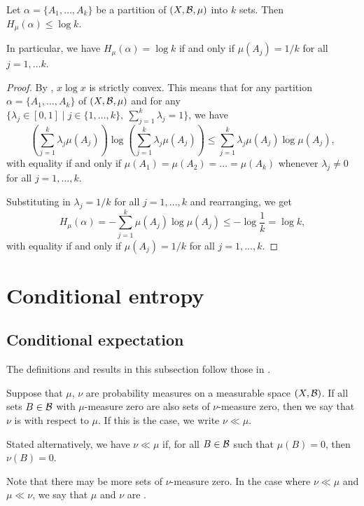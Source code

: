 \begin{proposition} \label{prop:walters-cor-4-2-1}
	Let $\alpha = \{A_1, \dots, A_k\}$ be a partition of $(X, \mathcal{B}, \mu)$ into $k$ sets. Then $H_\mu(\alpha) \leq \log{k}$.
	
	In particular, we have $H_\mu(\alpha) = \log{k}$ if and only if $\mu(A_j) = 1 / k$ for all $j = 1, \dots k$.
	
	\begin{proof}
		By , $x \log{x}$ is strictly convex. This means that for any partition $\alpha = \{A_1, \dots, A_k\}$ of $(X, \mathcal{B}, \mu)$ and for any $\{\lambda_j \in [0, 1] \mid j \in \{1, \dots, k\},\ \sum_{j = 1}^k{\lambda_j} = 1\}$, we have
		\[
			\left(\sum_{j = 1}^k{\lambda_j \mu(A_j)}\right) \log{\left(\sum_{j = 1}^k{\lambda_j \mu(A_j)}\right)} \leq \sum_{j = 1}^k{\lambda_j \mu(A_j) \log{\mu(A_j)}},
		\]
		with equality if and only if $\mu(A_1) = \mu(A_2) = \dots = \mu(A_k)$ whenever $\lambda_j \neq 0$ for all $j = 1, \dots, k$.
		
		Substituting in $\lambda_j = 1 / k$ for all $j = 1, \dots, k$ and rearranging, we get
		\[
			H_\mu(\alpha) = -\sum_{j = 1}^k{\mu(A_j) \log{\mu(A_j)}} \leq -\log{\frac{1}{k}} = \log{k},
		\]
		with equality if and only if $\mu(A_j) = 1 / k$ for all $j = 1, \dots, k$.
	\end{proof}
\end{proposition}

\section{Conditional entropy}
\subsection{Conditional expectation}
The definitions and results in this subsection follow those in \cite[p8-9]{walters:intro-to-ergodic-theory}.
\begin{definition}
	Suppose that $\mu$, $\nu$ are probability measures on a measurable space $(X, \mathcal{B})$. If all sets $B \in \mathcal{B}$ with $\mu$-measure zero are also sets of $\nu$-measure zero, then we say that $\nu$ is  with respect to $\mu$. If this is the case, we write $\nu \ll \mu$.
	
	Stated alternatively, we have $\nu \ll \mu$ if, for all $B \in \mathcal{B}$ such that $\mu(B) = 0$, then $\nu(B) = 0$.
	
	Note that there may be more sets of $\nu$-measure zero. In the case where $\nu \ll \mu$ and $\mu \ll \nu$, we say that $\mu$ and $\nu$ are .
\end{definition}

